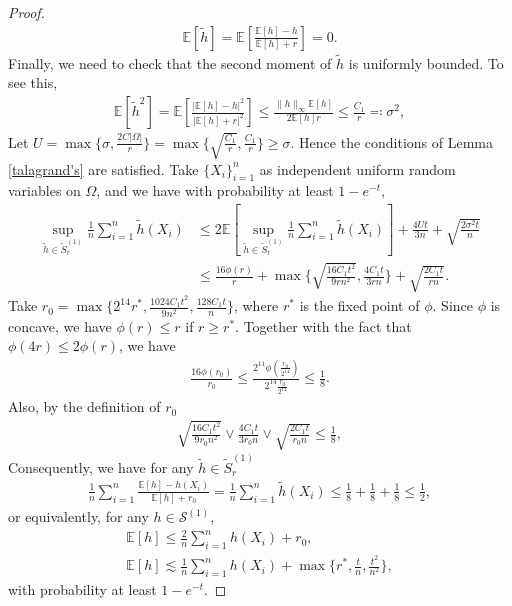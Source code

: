 \documentclass{article}
\newcommand{\E}{\mathbb{E}}
\theoremstyle{plain}
\theoremstyle{definition}
\theoremstyle{remark}
\begin{document}
\begin{proof}
    \begin{align*}
        \E[\tilde{h}] = \E \left[\frac{\E [h] - h}{\E[h] + r}\right] = 0.
    \end{align*}
    Finally, we need to check that the second moment of $\tilde{h}$ is uniformly bounded. To see this, 
    \begin{align*}
        \E [\tilde{h}^2 ] = \E \left[\frac{|\E [h] - h|^2}{|\E[h] + r|^2}\right] \leq \frac{ \|h\|_\infty \E[h]}{2 \E[h] r} \leq \frac{C_1}{r} \eqqcolon \sigma^2,
    \end{align*}
    Let $U = \max\{\sigma, \frac{2 C |\Omega|}{r}\} = \max\{\sqrt{\frac{C_1}{r}}, \frac{C_1}{r}\} \geq \sigma$. Hence the conditions of Lemma \ref{talagrand's} are satisfied. 
    Take $\{X_i\}_{i=1}^{n}$ as independent uniform random variables on $\Omega$, and we have with probability at least $1 - e^{-t}$, 
    \begin{align*}
        \sup_{\tilde{h} \in \tilde{S}_r^{(1)}} \frac{1}{n} \sum_{i=1}^{n} \tilde{h}(X_i) & \leq 2 \E \left[\sup_{\tilde{h} \in \tilde{S}_r^{(1)}} \frac{1}{n} \sum_{i=1}^{n} \tilde{h}(X_i) \right] + \frac{4 U t}{3 n} + \sqrt{\frac{2\sigma^2 t}{n}} \\
        & \leq \frac{16 \phi(r)}{r} + \max\{\sqrt{\frac{16 C_1 t^2 }{9 r n^2}}, \frac{4C_1 t}{3r n}\} + \sqrt{\frac{2 C_1 t}{r n}}.
    \end{align*}
    Take $r_0 = \max\{2^{14} r^*, \frac{1024 C_1  t^2}{9 n^2}, \frac{128 C_1 t}{n}\}$, where $r^*$ is the fixed point of $\phi$. Since $\phi$ is concave, we have $\phi(r) \leq r$ if $r \geq r^*$. Together with the fact that $\phi(4r) \leq 2 \phi(r)$, we have
    \begin{align*}
         \frac{16 \phi(r_0)}{r_0} \leq \frac{2^{11} \phi(\frac{r_0}{2^{14}})}{2^{14} \frac{r_0}{2^{14}}} \leq \frac{1}{8}. 
    \end{align*}
    Also, by the definition of $r_0$
    \begin{align*}
        \sqrt{\frac{16 C_1 t^2 }{9 r_0 n^2}} \vee \frac{4 C_1 t}{3 r_0 n} \vee \sqrt{\frac{2 C_1  t}{r_0 n}} \leq \frac{1}{8},
    \end{align*}
    Consequently, we have for any $\tilde{h} \in \tilde{S}_r^{(1)}$
    \begin{align*}
          \frac{1}{n} \sum_{i=1}^{n} \frac{\E[h] - h(X_i)}{\E[h] + r_0}  =\frac{1}{n} \sum_{i=1}^{n} \tilde{h}(X_i) \leq \frac{1}{8} + \frac{1}{8} + \frac{1}{8} \leq \frac{1}{2},
    \end{align*}
    or equivalently, for any $h \in \mathcal{S}^{(1)}$,
    \begin{gather*}
          \E[h] \leq  \frac{2}{n}\sum_{i=1}^{n} h(X_i) + r_0, \\
          \E[h] \lesssim  \frac{1}{n}\sum_{i=1}^{n} h(X_i) + \max\{r^*, \frac{t}{n}, \frac{t^2}{n^2}\},
    \end{gather*}    
    with probability at least $1 - e^{-t}$. 
\end{proof}
\end{document}
